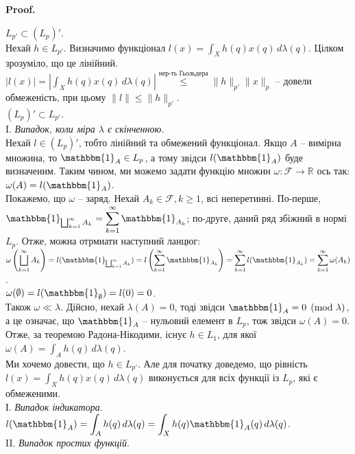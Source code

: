 \documentclass[a4paper, 10pt]{article}
\makeatletter
\theoremstyle{theoremdd}
\renewenvironment{proof}[1][Proof.\\]{\par
\pushQED{\hfill \qed}%
\normalfont \topsep6\p@\@plus6\p@\relax
\trivlist
\item\relax
{\bfseries
#1\@addpunct{.}}\hspace\labelsep\ignorespaces
}{%
\popQED\endtrivlist\@endpefalse
}
\makeatother
\begin{document}
\begin{proof}
$L_{p'} \subset (L_p)'$.\\
Нехай $h \in L_{p'}$. Визначимо функціонал $l(x) = \displaystyle\int_X h(q)x(q)\,d\lambda(q)$. Цілком зрозуміло, що це лінійний.\\
$|l(x)| = \displaystyle\left| \int_X h(q)x(q)\,d\lambda(q) \right| \overset{\text{нер-ть Гьольдера}}{\leq} \|h\|_{p'} \|x\|_p$ -- довели обмеженість, при цьому $\|l\| \leq \|h\|_{p'}$.
\bigskip \\
$(L_p)' \subset L_{p'}$.\\
I. \textit{Випадок, коли міра $\lambda$ є скінченною.}\\
Нехай $l \in (L_p)'$, тобто лінійний та обмежений функціонал. Якщо $A$ -- вимірна множина, то $\mathbbm{1}_A \in L_p$, а тому звідси $l(\mathbbm{1}_A)$ буде визначеним. Таким чином, ми можемо задати функцію множин $\omega \colon \mathcal{F} \to \mathbb{R}$ ось так: $\omega(A) = l(\mathbbm{1}_A)$. \\
Покажемо, що $\omega$ -- заряд. Нехай $A_k \in \mathcal{F}, k \geq 1$, всі неперетинні. По-перше, $\mathbbm{1}_{\bigsqcup_{k=1}^\infty A_k} = \displaystyle\sum_{k=1}^\infty \mathbbm{1}_{A_k}$; по-друге, даний ряд збіжний в нормі $L_p$. Отже, можна отрмиати наступний ланцюг:\\
$\displaystyle \omega\left(\bigsqcup_{k=1}^\infty A_k\right) = l(\mathbbm{1}_{\bigsqcup_{k=1}^\infty A_k}) = \displaystyle l\left( \sum_{k=1}^\infty \mathbbm{1}_{A_k} \right) = \sum_{k=1}^\infty l(\mathbbm{1}_{A_k}) = \sum_{k=1}^\infty \omega(A_k)$.\\
$\omega(\emptyset) = l(\mathbbm{1}_\emptyset) = l(0) = 0$.\\
Також $\omega \ll \lambda$. Дійсно, нехай $\lambda(A) = 0$, тоді звідси $\mathbbm{1}_A = 0 \pmod \lambda$, а це означає, що $\mathbbm{1}_A$ -- нульовий елемент в $L_p$, тож звідси $\omega(A) = 0$.\\
Отже, за теоремою Радона-Нікодими, існує $h \in L_1$, для якої $\omega(A) = \displaystyle\int_A h(q)\,d\lambda(q)$.\\
Ми хочемо довести, що $h \in L_{p'}$. Але для початку доведемо, що рівність $l(x) = \displaystyle\int_X h(q)x(q)\,d\lambda(q)$ виконується для всіх функції із $L_p$, які є обмеженими.\\
І. \textit{Випадок індикатора}.\\
$l(\mathbbm{1}_A) = \displaystyle\int_A h(q)\,d\lambda(q) = \int_X h(q) \mathbbm{1}_A(q)\,d\lambda(q)$.\\
II. \textit{Випадок простих функцій}.\\

\end{proof}
\end{document}
